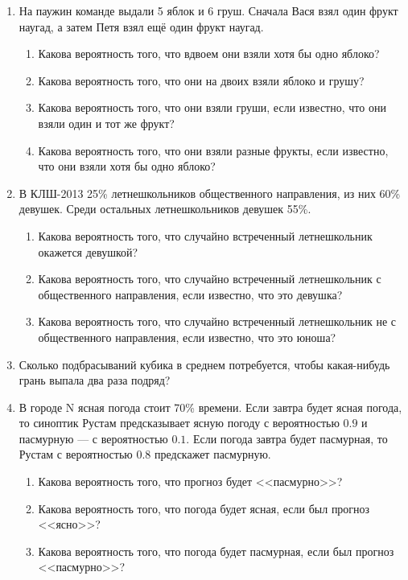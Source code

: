 \documentclass[pdftex,12pt,a4paper]{article}
\begin{document}
\begin{enumerate}

\item На паужин команде выдали 5 яблок и 6 груш. Сначала Вася взял один фрукт наугад, а затем Петя взял ещё один фрукт наугад. 
\begin{enumerate}
\item Какова вероятность того, что вдвоем они взяли хотя бы одно яблоко?
\item Какова вероятность того, что они на двоих взяли яблоко и грушу?
\item Какова вероятность того, что они взяли груши, если известно, что они взяли один и тот же фрукт?
\item Какова вероятность того, что они взяли разные фрукты, если известно, что они взяли хотя бы одно яблоко?
\end{enumerate}

\item В КЛШ-2013 25\% летнешкольников общественного направления, из них 60\% девушек. Среди остальных летнешкольников девушек 55\%. 
\begin{enumerate}
\item Какова вероятность того, что случайно встреченный летнешкольник окажется девушкой?
\item Какова вероятность того, что случайно встреченный летнешкольник с общественного направления, если известно, что это девушка?
\item Какова вероятность того, что случайно встреченный летнешкольник не с общественного направления, если известно, что это юноша?
\end{enumerate}


\item Сколько подбрасываний кубика в среднем потребуется, чтобы какая-нибудь грань выпала два раза подряд?

\item В городе N ясная погода стоит 70\% времени. Если завтра будет ясная погода, то синоптик Рустам предсказывает ясную погоду с вероятностью $0.9$ и пасмурную --- с вероятностью $0.1$. Если погода завтра будет пасмурная, то Рустам с вероятностью $0.8$ предскажет пасмурную. 
\begin{enumerate}
\item Какова вероятность того, что прогноз будет <<пасмурно>>?
\item Какова вероятность того, что погода будет ясная, если был прогноз <<ясно>>?
\item Какова вероятность того, что погода будет пасмурная, если был прогноз <<пасмурно>>?
\end{enumerate}



\end{enumerate}
\end{document}
